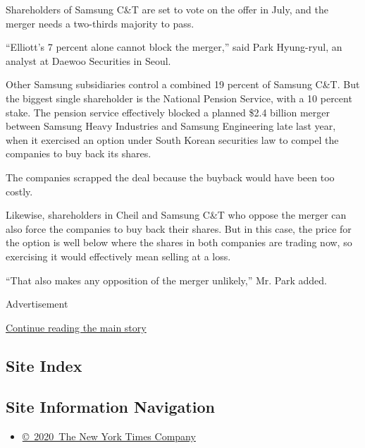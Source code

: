 Shareholders of Samsung C\&T are set to vote on the offer in July, and
the merger needs a two-thirds majority to pass.

``Elliott's 7 percent alone cannot block the merger,'' said Park
Hyung-ryul, an analyst at Daewoo Securities in Seoul.

Other Samsung subsidiaries control a combined 19 percent of Samsung
C\&T. But the biggest single shareholder is the National Pension
Service, with a 10 percent stake. The pension service effectively
blocked a planned \$2.4 billion merger between Samsung Heavy Industries
and Samsung Engineering late last year, when it exercised an option
under South Korean securities law to compel the companies to buy back
its shares.

The companies scrapped the deal because the buyback would have been too
costly.

Likewise, shareholders in Cheil and Samsung C\&T who oppose the merger
can also force the companies to buy back their shares. But in this case,
the price for the option is well below where the shares in both
companies are trading now, so exercising it would effectively mean
selling at a loss.

``That also makes any opposition of the merger unlikely,'' Mr. Park
added.

Advertisement

\protect\hyperlink{after-bottom}{Continue reading the main story}

\hypertarget{site-index}{%
\subsection{Site Index}\label{site-index}}

\hypertarget{site-information-navigation}{%
\subsection{Site Information
Navigation}\label{site-information-navigation}}

\begin{itemize}
\tightlist
\item
  \href{https://help.nytimes3xbfgragh.onion/hc/en-us/articles/115014792127-Copyright-notice}{©~2020~The
  New York Times Company}
\end{itemize}

